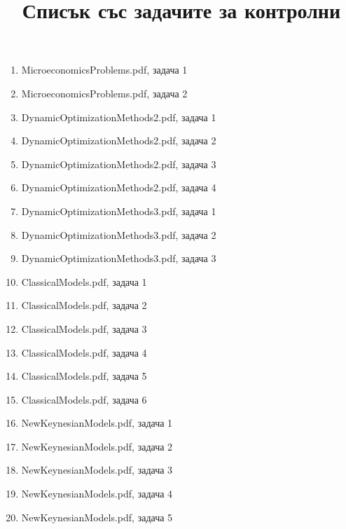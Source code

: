 \documentclass[10pt,a4paper]{article}
\title{Списък със задачите за контролни}
\date{}
\begin{document}
	\maketitle
	\begin{enumerate}
		\item MicroeconomicsProblems.pdf, задача 1
		\item MicroeconomicsProblems.pdf, задача 2
		\item DynamicOptimizationMethods2.pdf, задача 1
		\item DynamicOptimizationMethods2.pdf, задача 2
		\item DynamicOptimizationMethods2.pdf, задача 3
		\item DynamicOptimizationMethods2.pdf, задача 4
		\item DynamicOptimizationMethods3.pdf, задача 1
		\item DynamicOptimizationMethods3.pdf, задача 2
		\item DynamicOptimizationMethods3.pdf, задача 3
		\item ClassicalModels.pdf, задача 1
		\item ClassicalModels.pdf, задача 2
		\item ClassicalModels.pdf, задача 3
		\item ClassicalModels.pdf, задача 4
		\item ClassicalModels.pdf, задача 5
		\item ClassicalModels.pdf, задача 6
		\item NewKeynesianModels.pdf, задача 1
		\item NewKeynesianModels.pdf, задача 2
		\item NewKeynesianModels.pdf, задача 3
		\item NewKeynesianModels.pdf, задача 4
		\item NewKeynesianModels.pdf, задача 5
	\end{enumerate}
\end{document}

